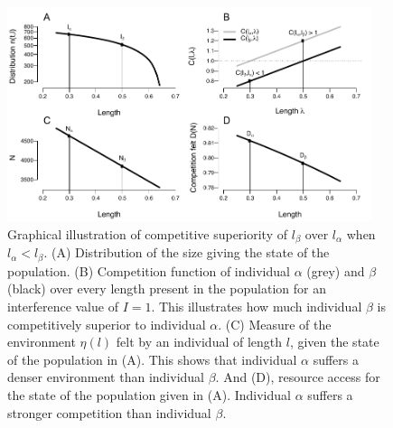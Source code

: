 \begin{figure}[!ht] %
\centering
\includegraphics[width=0.95\textwidth]{4_ChapThe1/Fig/FigSM12} 
\caption[Graphical illustration of competitive superiority of $l_{\beta}$ over
$l_{\alpha}$ when $l_{\alpha}<l_{\beta}$]{
Graphical illustration of competitive superiority of $l_{\beta}$ over
$l_{\alpha}$ when $l_{\alpha}<l_{\beta}$.
(A) Distribution of the size giving the state of the population. (B) Competition
function of individual $\alpha$ (grey) and $\beta$ (black) over every length
present in the population for an interference value of $I=1$. This illustrates
how much individual $\beta$ is competitively superior to individual $\alpha$.
(C) Measure of the environment $\eta(l)$ felt by an individual of length $l$,
given the state of the population in (A). This shows that individual $\alpha$
suffers a denser environment than individual $\beta$. And (D), resource access
for the state of the population given in (A). Individual $\alpha$ suffers a
stronger competition than individual $\beta$.}
\label{Fig4-SM12}
\end{figure}